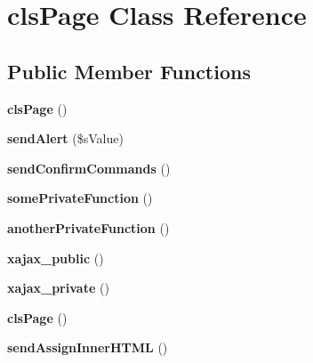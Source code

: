 \hypertarget{classclsPage}{
\section{clsPage Class Reference}
\label{classclsPage}
}
\subsection*{Public Member Functions}
\begin{DoxyCompactItemize}
\item 
\hypertarget{classclsPage_a7570ae140bcbd468397dce3f68a106dc}{
{\bfseries clsPage} ()}
\label{classclsPage_a7570ae140bcbd468397dce3f68a106dc}

\item 
\hypertarget{classclsPage_aee2d974a8f93f271be051969d695da3a}{
{\bfseries sendAlert} (\$sValue)}
\label{classclsPage_aee2d974a8f93f271be051969d695da3a}

\item 
\hypertarget{classclsPage_a62dc75ca69b796a3432f400ea2c27715}{
{\bfseries sendConfirmCommands} ()}
\label{classclsPage_a62dc75ca69b796a3432f400ea2c27715}

\item 
\hypertarget{classclsPage_af1f2641cf9312df033e289e8718699e9}{
{\bfseries somePrivateFunction} ()}
\label{classclsPage_af1f2641cf9312df033e289e8718699e9}

\item 
\hypertarget{classclsPage_a9b079a6e0b081aaadd0791fac652972b}{
{\bfseries anotherPrivateFunction} ()}
\label{classclsPage_a9b079a6e0b081aaadd0791fac652972b}

\item 
\hypertarget{classclsPage_ae22140ebb3b6d1b3acb67e652a30ec1d}{
{\bfseries xajax\_\-public} ()}
\label{classclsPage_ae22140ebb3b6d1b3acb67e652a30ec1d}

\item 
\hypertarget{classclsPage_a48caf3088da64329eac9c3f96ec692a7}{
{\bfseries xajax\_\-private} ()}
\label{classclsPage_a48caf3088da64329eac9c3f96ec692a7}

\item 
\hypertarget{classclsPage_a7570ae140bcbd468397dce3f68a106dc}{
{\bfseries clsPage} ()}
\label{classclsPage_a7570ae140bcbd468397dce3f68a106dc}

\item 
\hypertarget{classclsPage_aaf09734e5363319e3a7fabda94b32d8b}{
{\bfseries sendAssignInnerHTML} ()}
\label{classclsPage_aaf09734e5363319e3a7fabda94b32d8b}


\end{DoxyCompactItemize}
